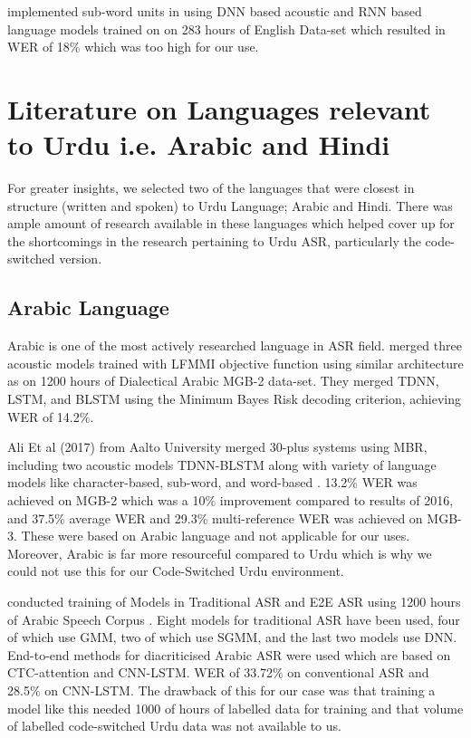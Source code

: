 \cite{smit_advances_2021} implemented sub-word units in using DNN based acoustic and RNN based language models trained on on 283 hours of English Data-set which resulted in WER of 18\% which was too high for our use. 

\section{Literature on Languages relevant to Urdu i.e. Arabic and Hindi}
For greater insights, we selected two of the languages that were closest in structure (written and spoken) to Urdu Language; Arabic and Hindi. There was ample amount of research available in these languages which helped cover up for the shortcomings in the research pertaining to Urdu ASR, particularly the code-switched version.

\subsection{Arabic Language}
Arabic is one of the most actively researched language in ASR field. \cite{khurana_qcri_2016} merged three acoustic models trained with LFMMI objective function using similar architecture as \cite{povey_purely_2016} on 1200 hours of Dialectical Arabic MGB-2 data-set. They merged TDNN, LSTM, and BLSTM using the Minimum Bayes Risk decoding criterion, achieving WER of 14.2\%. 

Ali Et al (2017) from Aalto University \cite{ali_speech_2017} merged 30-plus systems using MBR, including two acoustic models TDNN-BLSTM along with variety of language models like character-based, sub-word, and word-based \cite{smit_aalto_2017}. 13.2\% WER was achieved on MGB-2 which was a 10\% improvement compared to results of 2016, and 37.5\% average WER and 29.3\% multi-reference WER was achieved on MGB-3. These were based on Arabic language and not applicable for our uses. Moreover, Arabic is far more resourceful compared to Urdu which is why we could not use this for our Code-Switched Urdu environment. 

\cite{alsayadi_arabic_2021} conducted training of Models in Traditional ASR and E2E ASR using 1200 hours of Arabic Speech Corpus \cite{alhanai_development_2016}.
Eight models for traditional ASR have been used, four of which use GMM, two of which use SGMM, and the last two models use DNN. End-to-end methods for diacriticised Arabic ASR were used which are based on CTC-attention and CNN-LSTM. WER of 33.72\% on conventional ASR and 28.5\% on CNN-LSTM. The drawback of this for our case was that training a model like this needed 1000 of hours of labelled data for training and that volume of labelled code-switched Urdu data was not available to us.

